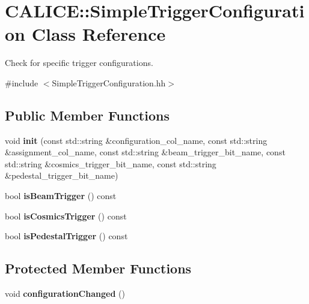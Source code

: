 \section{CALICE::SimpleTriggerConfiguration Class Reference}
\label{classCALICE_1_1SimpleTriggerConfiguration}


Check for specific trigger configurations.  


{\ttfamily \#include $<$SimpleTriggerConfiguration.hh$>$}\subsection*{Public Member Functions}
\begin{DoxyCompactItemize}
\item 
void {\bfseries init} (const std::string \&configuration\_\-col\_\-name, const std::string \&assignment\_\-col\_\-name, const std::string \&beam\_\-trigger\_\-bit\_\-name, const std::string \&cosmics\_\-trigger\_\-bit\_\-name, const std::string \&pedestal\_\-trigger\_\-bit\_\-name)\label{classCALICE_1_1SimpleTriggerConfiguration_af32ebbee6e51c79b3f14951597e08f13}

\item 
bool {\bfseries isBeamTrigger} () const \label{classCALICE_1_1SimpleTriggerConfiguration_ab6484d9f89f6462031a28df474a1a286}

\item 
bool {\bfseries isCosmicsTrigger} () const \label{classCALICE_1_1SimpleTriggerConfiguration_a8330e23aa2777662313198f2a380294d}

\item 
bool {\bfseries isPedestalTrigger} () const \label{classCALICE_1_1SimpleTriggerConfiguration_ac2abe0709c380808d3c16b7fb2c79c05}

\end{DoxyCompactItemize}
\subsection*{Protected Member Functions}
\begin{DoxyCompactItemize}
\item 
void {\bfseries configurationChanged} ()\label{classCALICE_1_1SimpleTriggerConfiguration_ad673a5a76ff0470f8eafe32966fb458c}

\end{DoxyCompactItemize}
